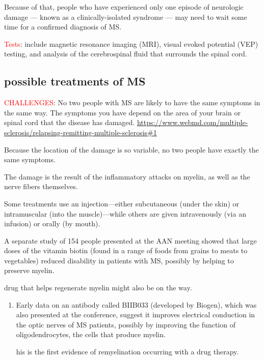 Because of that, people who have experienced only one episode of neurologic
damage — known as a clinically-isolated syndrome — may need to wait some time
for a confirmed diagnosis of MS.

\textcolor{red}{Tests}: include magnetic resonance imaging (MRI), visual evoked potential (VEP)
testing, and analysis of the cerebrospinal fluid that surrounds the spinal cord.




\subsection{possible treatments of MS}
\label{sec:MS-treatment}


\textcolor{red}{CHALLENGES}: No two people with MS are likely to have the same symptoms in the same way. 
The symptoms you have depend on the area of your brain or spinal cord that the disease has damaged. 
\url{https://www.webmd.com/multiple-sclerosis/relapsing-remitting-multiple-sclerosis#1}

\begin{mdframed}

Because the location of the damage is so variable, no two people have exactly the same symptoms.

The damage is the result of the inflammatory attacks on myelin, as well as the
nerve fibers themselves.

\end{mdframed}

Some treatments use an injection—either subcutaneous (under the skin) or
intramuscular (into the muscle)—while others are given intravenously (via an
infusion) or orally (by mouth).

A separate study of 154 people presented at the AAN meeting showed that large
doses of the vitamin biotin (found in a range of foods from grains to meats to
vegetables) reduced disability in patients with MS, possibly by helping to
preserve myelin.

 drug that helps regenerate myelin might also be on the way. 
 \begin{enumerate}
   
   \item   Early data on an antibody called BIIB033 (developed by Biogen), which was also presented at
   the conference, suggest it improves electrical conduction in the optic nerves
   of MS patients, possibly by improving the function of oligodendrocytes, the
   cells that produce myelin.
   
    	his is the first evidence of remyelination occurring with a drug therapy.
    
   
 \end{enumerate}



